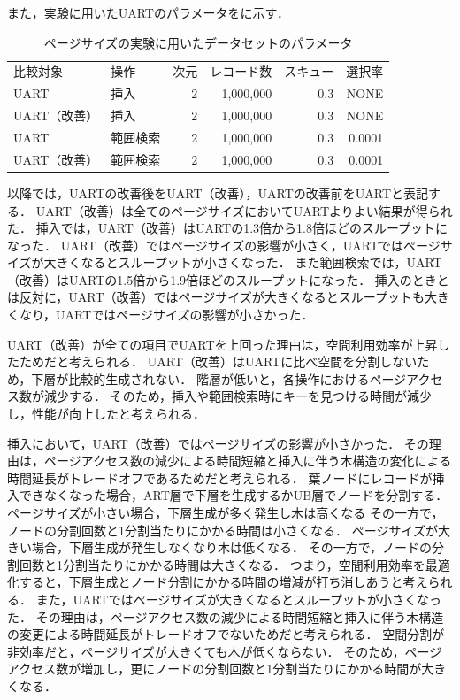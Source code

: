 また，実験に用いたUARTのパラメータを\Tab{\ref{tab:pagesize}}に示す．
\begin{table}[tb]
  \caption{ページサイズの実験に用いたデータセットのパラメータ}
  \label{tab:pagesize}
  \centering \small
  \begin{tabular}{llrrrr}
    \toprule
    比較対象     & 操作     & 次元 & レコード数 & スキュー & 選択率 \\
    \cmidrule(lr){1-1}
    \cmidrule(lr){2-2}
    \cmidrule(lr){3-3}
    \cmidrule(lr){4-4}
    \cmidrule(lr){5-5}
    \cmidrule(lr){6-6}
    UART         & 挿入     & 2    & 1,000,000  & 0.3      & NONE   \\
    UART（改善） & 挿入     & 2    & 1,000,000  & 0.3      & NONE   \\
    UART         & 範囲検索 & 2    & 1,000,000  & 0.3      & 0.0001 \\
    UART（改善） & 範囲検索 & 2    & 1,000,000  & 0.3      & 0.0001 \\
    \bottomrule
  \end{tabular}
\end{table}
以降では，UARTの改善後をUART（改善），UARTの改善前をUARTと表記する．
UART（改善）は全てのページサイズにおいてUARTよりよい結果が得られた．
挿入では，UART（改善）はUARTの1.3倍から1.8倍ほどのスループットになった．
UART（改善）ではページサイズの影響が小さく，UARTではページサイズが大きくなるとスループットが小さくなった．
また範囲検索では，UART（改善）はUARTの1.5倍から1.9倍ほどのスループットになった．
挿入のときとは反対に，UART（改善）ではページサイズが大きくなるとスループットも大きくなり，UARTではページサイズの影響が小さかった．

UART（改善）が全ての項目でUARTを上回った理由は，空間利用効率が上昇したためだと考えられる．
UART（改善）はUARTに比べ空間を分割しないため，下層が比較的生成されない．
階層が低いと，各操作におけるページアクセス数が減少する．
そのため，挿入や範囲検索時にキーを見つける時間が減少し，性能が向上したと考えられる．

挿入において，UART（改善）ではページサイズの影響が小さかった．
その理由は，ページアクセス数の減少による時間短縮と挿入に伴う木構造の変化による時間延長がトレードオフであるためだと考えられる．
葉ノードにレコードが挿入できなくなった場合，ART層で下層を生成するかUB層でノードを分割する．
ページサイズが小さい場合，下層生成が多く発生し木は高くなる
その一方で，ノードの分割回数と1分割当たりにかかる時間は小さくなる．
ページサイズが大きい場合，下層生成が発生しなくなり木は低くなる．
その一方で，ノードの分割回数と1分割当たりにかかる時間は大きくなる．
つまり，空間利用効率を最適化すると，下層生成とノード分割にかかる時間の増減が打ち消しあうと考えられる．
また，UARTではページサイズが大きくなるとスループットが小さくなった．
その理由は，ページアクセス数の減少による時間短縮と挿入に伴う木構造の変更による時間延長がトレードオフでないためだと考えられる．
空間分割が非効率だと，ページサイズが大きくても木が低くならない．
そのため，ページアクセス数が増加し，更にノードの分割回数と1分割当たりにかかる時間が大きくなる．


